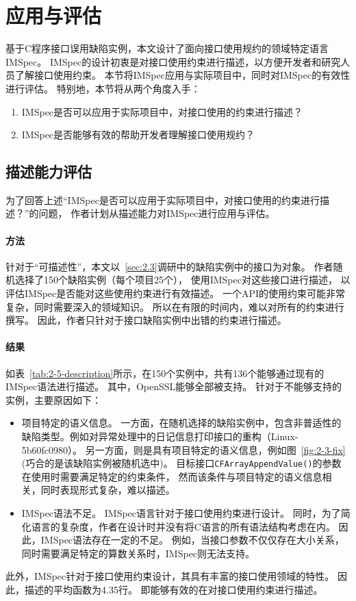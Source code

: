 \section{应用与评估}
\label{sec:2.5}
基于C程序接口误用缺陷实例，本文设计了面向接口使用规约的领域特定语言IMSpec。
IMSpec的设计初衷是对接口使用约束进行描述，以方便开发者和研究人员了解接口使用约束。
本节将IMSpec应用与实际项目中，同时对IMSpec的有效性进行评估。
特别地，本节将从两个角度入手：
\begin{enumerate}
	\item IMSpec是否可以应用于实际项目中，对接口使用的约束进行描述？
	\item IMSpec是否能够有效的帮助开发者理解接口使用规约？
\end{enumerate}


\subsection{描述能力评估}
为了回答上述“IMSpec是否可以应用于实际项目中，对接口使用的约束进行描述？”的问题，
作者计划从描述能力对IMSpec进行应用与评估。

\paragraph{方法}
针对于“可描述性”，本文以~\ref{sec:2.3}调研中的缺陷实例中的接口为对象。
作者随机选择了150个缺陷实例（每个项目25个），
使用IMSpec对这些接口进行描述，
以评估IMSpec是否能对这些使用约束进行有效描述。
一个API的使用约束可能非常复杂，同时需要深入的领域知识。
所以在有限的时间内，难以对所有的约束进行撰写。
因此，作者只针对于接口缺陷实例中出错的约束进行描述。

\paragraph{结果}

如表~\ref{tab:2-5-description}所示，在150个实例中，共有136个能够通过现有的IMSpec语法进行描述。
其中，OpenSSL能够全部被支持。
针对于不能够支持的实例，主要原因如下：
\begin{itemize}
	\item 项目特定的语义信息。
	一方面，在随机选择的缺陷实例中，包含非普适性的缺陷类型。例如对异常处理中的日记信息打印接口的重构（Linux-5b60fc0980）。
	另一方面，则是具有项目特定的语义信息，例如图~\ref{fig:2-3-fix}(巧合的是该缺陷实例被随机选中)。
	目标接口\texttt{CFArrayAppendValue()}的参数在使用时需要满足特定的约束条件，
	然而该条件与项目特定的语义信息相关，同时表现形式复杂，难以描述。
	\item IMSpec语法不足。
	IMSpec语言针对于接口使用约束进行设计。
	同时，为了简化语言的复杂度，作者在设计时并没有将C语言的所有语法结构考虑在内。
	因此，IMSpec语法存在一定的不足。
	例如，当接口参数不仅仅存在大小关系，同时需要满足特定的算数关系时，IMSpec则无法支持。
\end{itemize}
此外，IMSpec针对于接口使用约束设计，其具有丰富的接口使用领域的特性。
因此，描述的平均函数为4.35行。
即能够有效的在对接口使用约束进行描述。

